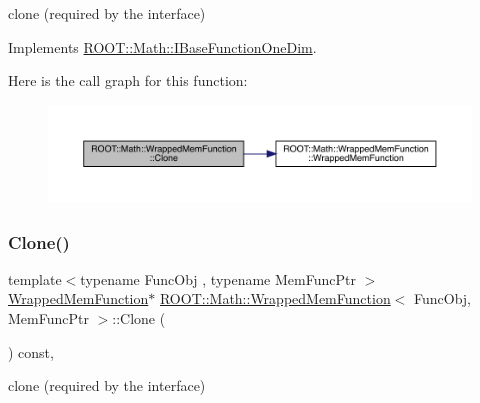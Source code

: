 clone (required by the interface) 



Implements \mbox{\hyperlink{classROOT_1_1Math_1_1IBaseFunctionOneDim_a656dbb4dfc43e8d1566442bfb1a717fd}{R\+O\+O\+T\+::\+Math\+::\+I\+Base\+Function\+One\+Dim}}.

Here is the call graph for this function\+:
\nopagebreak
\begin{figure}[H]
\begin{center}
\leavevmode
\includegraphics[width=350pt]{dd/df6/classROOT_1_1Math_1_1WrappedMemFunction_a6f27e92240e16003ff20c25df6fba1eb_cgraph}
\end{center}
\end{figure}
\mbox{\label{classROOT_1_1Math_1_1WrappedMemFunction_a6f27e92240e16003ff20c25df6fba1eb}} 
\subsubsection{\texorpdfstring{Clone()}{Clone()}\hspace{0.1cm}{\footnotesize\ttfamily [2/2]}}
{\footnotesize\ttfamily template$<$typename Func\+Obj , typename Mem\+Func\+Ptr $>$ \\
\mbox{\hyperlink{classROOT_1_1Math_1_1WrappedMemFunction}{Wrapped\+Mem\+Function}}$\ast$ \mbox{\hyperlink{classROOT_1_1Math_1_1WrappedMemFunction}{R\+O\+O\+T\+::\+Math\+::\+Wrapped\+Mem\+Function}}$<$ Func\+Obj, Mem\+Func\+Ptr $>$\+::Clone (\begin{DoxyParamCaption}{ }\end{DoxyParamCaption}) const\hspace{0.3cm}{\ttfamily [inline]}, {\ttfamily [virtual]}}



clone (required by the interface) 



